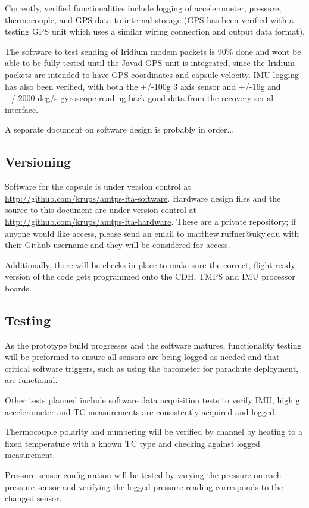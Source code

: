 \documentclass{article}
\begin{document}
Currently, verified functionalities include logging of accelerometer, pressure, thermocouple, and GPS data to internal storage (GPS has been verified with a testing GPS unit which uses a similar wiring connection and output data format).

The software to test sending of Iridium modem packets is 90\% done and wont be able to be fully tested until the Javad GPS unit is integrated, since the Iridium packets are intended to have GPS coordinates and capsule velocity. IMU logging has also been verified, with both the +/-100g 3 axis sensor and +/-16g and +/-2000 deg/s gyroscope reading back good data from the recovery serial interface.

A separate document on software design is probably in order...

\subsection{Versioning}

Software for the capsule is under version control at \url{http://github.com/krups/amtps-fta-software}. Hardware design files and the source to this document are under version control at \url{http://github.com/krups/amtps-fta-hardware}. These are a private repository; if anyone would like access, please send an email to matthew.ruffner@uky.edu with their Github username and they will be considered for access.

Additionally, there will be checks in place to make sure the correct, flight-ready version of the code gets programmed onto the CDH, TMPS and IMU processor boards.

\subsection{Testing}
As the prototype build progresses and the software matures, functionality testing will be preformed to ensure all sensors are being logged as needed and that critical software triggers, such as using the barometer for parachute deployment, are functional.

Other tests planned include software data acquisition tests to verify IMU, high g accelerometer and TC measurements are consistently acquired and logged.

Thermocouple polarity and numbering will be verified by channel by heating to a fixed temperature with a known TC type and checking against logged measurement.

Pressure sensor configuration will be tested by varying the pressure on each pressure sensor and verifying the logged pressure reading corresponds to the changed sensor.
\end{document}
